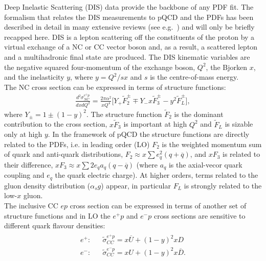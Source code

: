 Deep Inelastic Scattering (DIS) data provide the backbone of any PDF fit.
The formalism that relates the DIS measurements to pQCD and the PDFs has been described
 in detail in many extensive reviews (see e.g.~\cite{disbook}) and will only be briefly recapped here.
DIS is a lepton scattering off the 
constituents of the proton by a virtual exchange of a NC 
or CC vector boson and, as a result, a scattered lepton and a 
multihadronic final state are produced.
The DIS kinematic variables are the negative squared four-momentum of 
the exchange boson, $Q^2$, the Bjorken $x$, 
and the inelasticity $y$, where $y=Q^2/sx$ and $s$ is the centre-of-mass energy.
\\
%
The NC cross section can be expressed in terms of structure functions:
\begin{eqnarray}
   \frac{d^2\sigma_{NC}^{e^{\pm} p}}{dxdQ^2}=\frac{2\pi\alpha^2}{xQ^4} 
     \big [ Y_{+} \tilde F_2^{\pm} \mp Y_{-}x \tilde F_3^{\pm} - y^2 \tilde F_L^{\pm} \big ],
\end{eqnarray}
where $Y_{\pm} = 1 \pm (1-y)^2$. The structure function $\tilde F_2$
is the dominant contribution to the cross section, $x \tilde F_3$ is important at high $Q^2$ and $\tilde F_L$ is sizable 
only at high $y$. 
In the framework of pQCD the structure functions are directly related to the 
PDFs, i.e. in leading order (LO)  $F_2$ is the weighted momentum sum of quark and anti-quark distributions, 
$F_2 \approx x \sum e^2_q (q+ \overline q)$, and $xF_3$ is related to their difference, 
    $xF_3 \approx x \sum 2e_q a_q (q- \overline q)$ (where $a_q$ is the axial-vecor quark coupling and $e_q$ the quark electric charge). 
    At higher orders, terms related to the gluon density distribution
($\alpha_s g$) appear, in particular $F_L$ is strongly related to the low-$x$ 
gluon.
\\
The inclusive CC $ep$ cross section can be expressed 
in terms of another set of structure functions and in LO the $e^+p$ and $e^-p$ cross sections are sensitive to different quark flavour 
densities:
\begin{eqnarray}
    \begin{array}{rll}
   e^{+}:  & & \tilde \sigma_{CC}^{e^{+} p} = 
                x\overline U + (1-y)^2 xD  \\
   e^{-}:  & & \tilde \sigma_{CC}^{e^{-} p} = 
                xU + (1-y)^2 x\overline D.
    \end{array}
\end{eqnarray}
